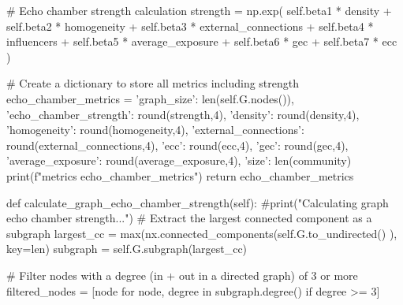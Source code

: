 \begin{codigo}[caption={Exemplo de classe Python para deteção de câmaras de eco}, label={codigo:echochamberdetector}, language=Python, breaklines=true]
        # Echo chamber strength calculation
        strength = np.exp(
            self.beta1 * density +
            self.beta2 * homogeneity +
            self.beta3 * external_connections +
            self.beta4 * influencers +
            self.beta5 * average_exposure  +
            self.beta6 * gec +
            self.beta7 * ecc
        )

        # Create a dictionary to store all metrics including strength
        echo_chamber_metrics = {
            'graph_size': len(self.G.nodes()),
            'echo_chamber_strength': round(strength,4),
            'density': round(density,4),
            'homogeneity': round(homogeneity,4),
            'external_connections': round(external_connections,4),
            'ecc': round(ecc,4),
            'gec': round(gec,4),
            'average_exposure': round(average_exposure,4),
            'size': len(community)
        }
        print(f"metrics {echo_chamber_metrics}")
        return echo_chamber_metrics


    def calculate_graph_echo_chamber_strength(self):
        #print("Calculating graph echo chamber strength...")
        # Extract the largest connected component as a subgraph
        largest_cc = max(nx.connected_components(self.G.to_undirected() ), key=len)
        subgraph = self.G.subgraph(largest_cc)

        # Filter nodes with a degree (in + out in a directed graph) of 3 or more
        filtered_nodes = [node for node, degree in subgraph.degree() if degree >= 3]


\end{codigo}

